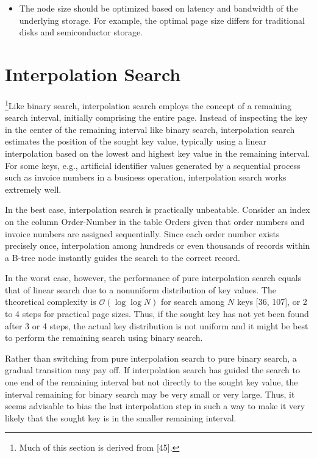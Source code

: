 \begin{itemize}
\item
  The node size should be optimized based on latency and bandwidth of
  the underlying storage. For example, the optimal page size differs for
  traditional disks and semiconductor storage.
\end{itemize}

\hypertarget{interpolation-search}{%
\section{Interpolation Search}\label{interpolation-search}}

\footnote{Much of this section is derived from {[}45{]}.}Like binary
search, interpolation search employs the concept of a remaining search
interval, initially comprising the entire page. Instead of inspecting
the key in the center of the remaining interval like binary search,
interpolation search estimates the position of the sought key value,
typically using a linear interpolation based on the lowest and highest
key value in the remaining interval. For some keys, e.g., artificial
identifier values generated by a sequential process such as invoice
numbers in a business operation, interpolation search works extremely
well.

In the best case, interpolation search is practically unbeatable.
Consider an index on the column Order-Number in the table Orders given
that order numbers and invoice numbers are assigned sequentially. Since
each order number exists precisely once, interpolation among hundreds or
even thousands of records within a B-tree node instantly guides the
search to the correct record.

In the worst case, however, the performance of pure interpolation search
equals that of linear search due to a nonuniform distribution of key
values. The theoretical complexity is $\mathcal{O}(\log\log N)$ for search among
$N$ keys {[}36, 107{]}, or 2 to 4 steps for practical page sizes.
Thus, if the sought key has not yet been found after 3 or 4 steps, the
actual key distribution is not uniform and it might be best to perform
the remaining search using binary search.

Rather than switching from pure interpolation search to pure binary
search, a gradual transition may pay off. If interpolation search has
guided the search to one end of the remaining interval but not directly
to the sought key value, the interval remaining for binary search may be
very small or very large. Thus, it seems advisable to bias the last
interpolation step in such a way to make it very likely that the sought
key is in the smaller remaining interval.

